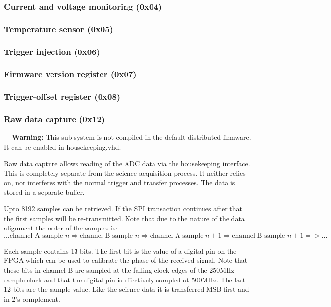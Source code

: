 \documentclass[a4paper,indent]{paper}
\newenvironment{warning}
{\par\begin{mdframed}[linewidth=2pt,linecolor=orange,backgroundcolor=orange!10]%
    \begin{list}{}{\leftmargin=0mm}\item[\bf\danger{}~~Warning: ]}
  {\end{list}\end{mdframed}\par}
\begin{document}
\subsubsection{Current and voltage monitoring (0x04)}

\subsubsection{Temperature sensor (0x05)}

\subsubsection{Trigger injection (0x06)}

\subsubsection{Firmware version register (0x07)}

\subsubsection{Trigger-offset register (0x08)}

\subsubsection{Raw data capture (0x12)}

\begin{warning}
  This sub-system is not compiled in the default distributed firmware. It can be enabled in housekeeping.vhd.
\end{warning}

Raw data capture allows reading of the ADC data via the housekeeping interface.
This is completely separate from the science acquisition process.
It neither relies on, nor interferes with the normal trigger and transfer processes.
The data is stored in a separate buffer.

Upto 8192 samples can be retrieved. If the \ac{SPI} transaction continues after that the first samples will be re-transmitted. Note that due to the nature of the  data alignment the order of the samples is:
$$
\ldots \text{channel A sample } n \Rightarrow \text{channel B sample } n \Rightarrow \text{channel A sample } n+1 \Rightarrow \text{channel B sample } n+1 => \ldots
$$

Each sample contains 13 bits. The first bit is the value of a digital pin on the \ac{FPGA} which can be used to calibrate the phase of the received signal. Note that these bits in channel B are sampled at the falling clock edges of the 250MHz sample clock and that the digital pin is effectively sampled at 500MHz. The last 12 bits are the sample value. Like the science data it is transferred MSB-first and in 2's-complement. 
\end{document}
